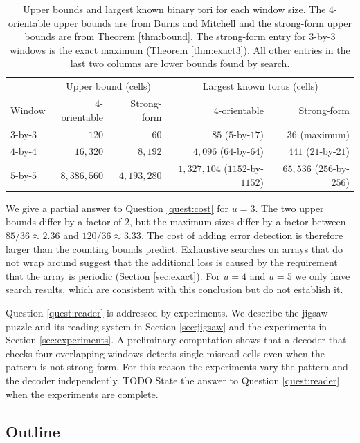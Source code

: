 \documentclass{lipics-v2021}
\newcommand{\todo}[1]{{\color{blue}TODO #1}}
\begin{document}
\begin{table}[htbp]
\centering
\small
\begin{tabular}{@{}lrrrr@{}}
\toprule
 & \multicolumn{2}{c}{Upper bound (cells)} & \multicolumn{2}{c}{Largest known torus (cells)} \\
Window & 4-orientable & Strong-form & 4-orientable & Strong-form \\
\midrule
$3$-by-$3$ & $120$ & $60$ & $85$ ($5$-by-$17$) & $36$ (maximum) \\
$4$-by-$4$ & $16{,}320$ & $8{,}192$ & $4{,}096$ ($64$-by-$64$) & $441$ ($21$-by-$21$) \\
$5$-by-$5$ & $8{,}386{,}560$ & $4{,}193{,}280$ & $1{,}327{,}104$ ($1152$-by-$1152$) & $65{,}536$ ($256$-by-$256$) \\
\bottomrule
\end{tabular}
\caption{Upper bounds and largest known binary tori for each window size.
The 4-orientable upper bounds are from Burns and Mitchell \cite{burns1993coding} and the strong-form upper bounds are from Theorem \ref{thm:bound}.
The strong-form entry for $3$-by-$3$ windows is the exact maximum (Theorem \ref{thm:exact3}).
All other entries in the last two columns are lower bounds found by search.}
\label{tab:sizes}
\end{table}

We give a partial answer to Question \ref{quest:cost} for $u=3$.
The two upper bounds differ by a factor of $2$, but the maximum sizes differ by a factor between $85/36 \approx 2.36$ and $120/36 \approx 3.33$.
The cost of adding error detection is therefore larger than the counting bounds predict.
Exhaustive searches on arrays that do not wrap around suggest that the additional loss is caused by the requirement that the array is periodic (Section \ref{sec:exact}).
For $u=4$ and $u=5$ we only have search results, which are consistent with this conclusion but do not establish it.

Question \ref{quest:reader} is addressed by experiments.
We describe the jigsaw puzzle and its reading system in Section \ref{sec:jigsaw} and the experiments in Section \ref{sec:experiments}.
A preliminary computation shows that a decoder that checks four overlapping windows detects single misread cells even when the pattern is not strong-form.
For this reason the experiments vary the pattern and the decoder independently.
\todo{State the answer to Question \ref{quest:reader} when the experiments are complete.}

\subsection{Outline}
\label{sec:intro_outline}
\end{document}
